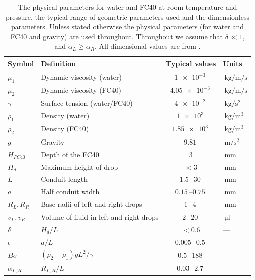 \documentclass{jfm}
\begin{document}
\begin{table}
\centering
\begin{tabular}{l l c l} 
\textbf{Symbol} & \textbf{Definition} &  \textbf{Typical values}    & \textbf{Units}
\\ \hline
$\mu_1$ & Dynamic viscosity (water) & $ \SI{1e-3}{}$  & $ \SI{}{\kilogram\per\meter\per\second}$ 
\\ $\mu_2$ & Dynamic viscosity (FC40) & $ \SI{4.05e-3}{}$  & $ \SI{}{\kilogram\per\meter\per\second}$ 
\\  $\gamma$ & Surface tension (water/FC40) & $\SI{4e-2}{}$  & $\SI{}{\kilogram\per\second\squared}$  
\\    $\rho_1$ & Density  (water)  & $ \SI{1e3}{}$ & $ \SI{}{\kilogram\per\meter\cubed}$ 
\\   $\rho_2$ & Density   (FC40)  & 
$ \SI{1.85e3}{}$  & 
$ \SI{}{\kilogram\per\meter\cubed}$ 
\\ $g$ & Gravity  & $ \SI{9.81}{}$ & $ \SI{}{\meter\per\second\squared}$
\\ $H_{FC40}$ & Depth of the FC40  & $  3$  & $ \SI{}{\milli\meter}$
\\ $H_d$ & Maximum height of drop  & $ < 3$  & $ \SI{}{\milli\meter}$
\\ $L$ &  Conduit  length  & $ \SIrange{1.5}{30}{}$ & $ \SI{}{\milli\meter}$ 
\\ $a$ & Half  conduit  width  & $ \SIrange{0.15}{0.75}{}$  & $ \SI{}{\milli\meter}$
\\ $R_L,R_R $ & Base radii of left and right drops  & $ \SIrange{1}{4}{}$   & $ \SI{}{\milli\meter}$ 
\\ $v_L, v_R$ & Volume of fluid in left and right drops & $ \SIrange{2}{20}{}$ & $ \SI{}{\micro\litre}$ 
\\ \hline
 $\delta$ &   $H_d/L$ \quad   & $ < 0.6$   & ---
\\ $\epsilon$ & $a/L$ & $ \SIrange{0.005}{0.5}{}$   & ---
\\ $Bo $ & $(\rho_2 -\rho_1 )g L^2/\gamma$ & $ \SIrange{0.5}{188}{}$  & ---
\\ $\alpha_{L,R}$   &   $R_{L,R}/{L} $   & $ \SIrange{0.03}{2.7}{}  $ & ---
\\ \hline
 \end{tabular}
\caption{The   physical parameters for water and FC40 at room temperature and pressure, the typical range of geometric parameters  used and the dimensionless parameters. 
Unless stated otherwise the physical parameters (for water and FC40 and gravity)  are used throughout. 
Throughout we assume that $\delta \ll 1$, and $\alpha_L \geq \alpha_R$.
All dimensional values are  from  \cite{Walsh2017MicrofluidicsWalls}.  
}
\label{tab: parameters}
\end{table} 
\end{document}
